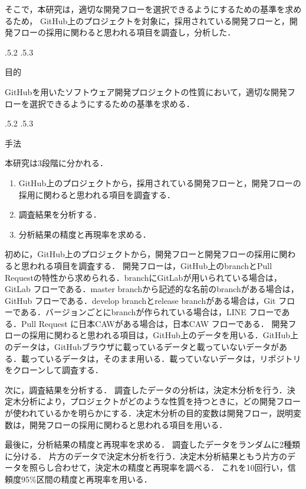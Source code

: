 \documentclass[uplatex,twocolumn]{jsarticle}
\makeatletter
\renewcommand{\section}{%
    \if@slide\clearpage\fi
    \@startsection{section}{1}{\z@}%
    {\Cvs \@plus.5\Cdp \@minus.2\Cdp}%
    {.5\Cvs \@plus.3\Cdp}%
    {\normalfont\raggedright}}
\makeatother
\begin{document}
そこで，本研究は，適切な開発フローを選択できるようにするための基準を求めるため，
GitHub上のプロジェクトを対象に，採用されている開発フローと，開発フローの採用に関わると思われる項目を調査し，分析した．

\section{目的}

GitHubを用いたソフトウェア開発プロジェクトの性質において，適切な開発フローを選択できるようにするための基準を求める．

\section{手法}


本研究は3段階に分かれる．
\begin{enumerate}
\item GitHub上のプロジェクトから，採用されている開発フローと，開発フローの採用に関わると思われる項目を調査する．
\item 調査結果を分析する．
\item 分析結果の精度と再現率を求める． 
\end{enumerate}

初めに，GitHub上のプロジェクトから，開発フローと開発フローの採用に関わると思われる項目を調査する．
開発フローは，GitHub上のbranchとPull Requestの特性から求められる．branchにGitLabが用いられている場合は，GitLab フローである．master branchから記述的な名前のbranchがある場合は，GitHub フローである．develop branchとrelease branchがある場合は，Git フローである．バージョンごとにbranchが作られている場合は，LINE フローである．Pull Request に日本CAWがある場合は，日本CAW フローである．
開発フローの採用に関わると思われる項目は，GitHub上のデータを用いる．GitHub上のデータは，GitHubブラウザに載っているデータと載っていないデータがある．載っているデータは，そのまま用いる．載っていないデータは，リポジトリをクローンして調査する．

次に，調査結果を分析する．
調査したデータの分析は，決定木分析を行う．決定木分析により，プロジェクトがどのような性質を持つときに，どの開発フローが使われているかを明らかにする．决定木分析の目的変数は開発フロー，説明変数は，開発フローの採用に関わると思われる項目を用いる．

最後に，分析結果の精度と再現率を求める．
調査したデータをランダムに2種類に分ける．
片方のデータで決定木分析を行う．决定木分析結果ともう片方のデータを照らし合わせて，決定木の精度と再現率を調べる．
これを10回行い，信頼度95\%区間の精度と再現率を用いる．
\end{document}
